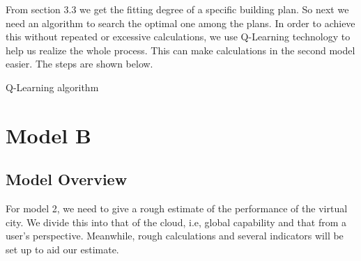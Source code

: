 \documentclass[12pt]{article}
\theoremstyle{definition}
\theoremstyle{remark}
\numberwithin{equation}{section}
\begin{document}
		From section 3.3 we get the fitting degree of a specific building plan. So next we need an algorithm to search the optimal one among the plans. In order to achieve this without repeated or excessive calculations, we use Q-Learning technology to help us realize the whole process. This can make calculations in the second model easier. The steps are shown below.
		
	 	\begin{algorithm}
	 	\caption{Q-Learning algorithm}
	 	\begin{algorithmic}
 		\ENDWHILE
 		\ENDFOR
	 	\ENDFOR
	 	\end{algorithmic}
	 	\end{algorithm}

	\section{Model B}
	\subsection{Model Overview}
		For model 2, we need to give a rough estimate of the performance of the virtual city. We divide this into that of the cloud, i.e, global capability and that from a user's perspective. Meanwhile, rough calculations and several indicators will be set up to aid our estimate.
\end{document}

